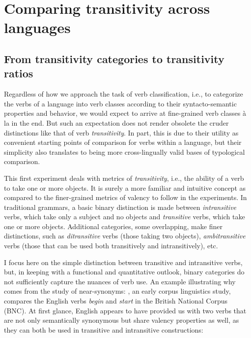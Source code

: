 \chapter{Comparing transitivity across languages}\label{chapter:transitivity}

\section{From transitivity categories to transitivity ratios}
Regardless of how we approach the task of verb classification, i.e., to categorize the verbs of a language into verb classes according to their syntacto-semantic properties and behavior, we would expect to arrive at fine-grained verb classes à la \citet{levin1993} in the end. But such an expectation does not render obsolete the cruder distinctions like that of verb \textit{transitivity}. In part, this is due to their utility as convenient starting points of comparison for verbs within a language, but their simplicity also translates to being more cross-lingually valid bases of typological comparison. 

This first experiment deals with metrics of \textit{transitivity}, i.e., the ability of a verb to take one or more objects. It is surely a more familiar and intuitive concept as compared to the finer-grained metrics of valency to follow in the experiments. In traditional grammars, a basic binary distinction is made between \textit{intransitive} verbs, which take only a subject and no objects and \textit{transitive} verbs, which take one or more objects. Additional categories, some overlapping, make finer distinctions, such as \textit{ditransitive} verbs (those taking two objects), \textit{ambitransitive} verbs (those that can be used both transitively and intransitively), etc.

I focus here on the simple distinction between transitive and intransitive verbs, but, in keeping with a functional and quantitative outlook, binary categories do not sufficiently capture the nuances of verb use. An example illustrating why comes from the study of near-synonyms: \citep{biber1998}, an early corpus linguistics study, compares the English verbs \textit{begin} and \textit{start} in the British National Corpus (BNC). At first glance, English appears to have provided us with two verbs that are not only semantically synonymous but share valency properties as well, as they can both be used in transitive and intransitive constructions:

